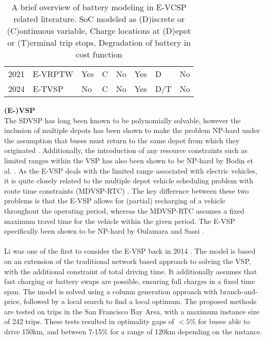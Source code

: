 \documentclass[]{article}
\begin{document}
\begin{table}[]
\begin{tabular}{clllllll}
    \addlinespace[0.4em]
    \cite{Ham2021} 2021              & E-VRPTW & Yes & C   & No            & Yes         & D            & No          \\
    \cite{Stadnichuk2024} 2024       & E-TVSP  & No  & C   & No            & Yes         & D/T          & No          \\
    \bottomrule
  \end{tabular}
  \caption{A brief overview of battery modeling in E-VCSP related literature. SoC modeled as (D)iscrete or (C)ontinuous variable, Charge locations at (D)epot or (T)erminal trip stops, Degradation of battery in cost function}
  \label{tab:eVCSP-lit}
\end{table}
\noindent \textbf{(E-)VSP} \\
The SDVSP has long been known to be polynomially solvable, however the inclusion of
multiple depots has been shown to make the problem NP-hard under the assumption
that buses must return to the same depot from which they originated
\cite{Bunte2009}. Additionally, the introduction of any resource constraints
such as limited ranges within the VSP has also been shown to be NP-hard by
Bodin et al. \cite{Bodin1983}. As the E-VSP deals with the limited range
associated with electric vehicles, it is quite closely related to the multiple
depot vehicle scheduling problem with route time constraints (MDVSP-RTC)
\cite{Haghani2002}. The key difference between these two problems is that the
E-VSP allows for (partial) recharging of a vehicle throughout the operating
period, whereas the MDVSP-RTC assumes a fixed maximum travel time for the
vehicle within the given period. The E-VSP specifically been shown to be
NP-hard by Oulamara and Sassi \cite{Sassi2014}. \\\\
Li was one of the first to consider the E-VSP back in 2014 \cite{Li2014}. The
model is based on an extension of the traditional network based approach to
solving the VSP, with the additional constraint of total driving time. It
additionally assumes that fast charging or battery swaps are possible, ensuring
full charges in a fixed time span. The model is solved using a column generation
approach with branch-and-price, followed by a local search to find a local
optimum. The proposed methods are tested on trips in the San Francisco Bay
Area, with a maximum instance size of 242 trips. These tests resulted in
optimality gaps of $<5\%$ for buses able to drive 150km, and between 7-15\%
for a range of 120km depending on the instance. \\\\
\end{document}
